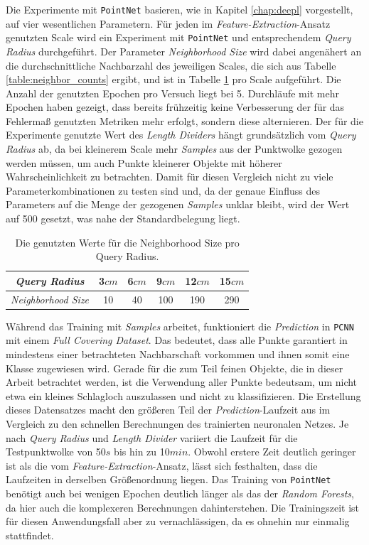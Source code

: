 Die Experimente mit \texttt{PointNet} basieren, wie in Kapitel \ref{chap:deepl} vorgestellt, auf vier wesentlichen Parametern. Für jeden im \textit{Feature-Extraction}-Ansatz genutzten Scale wird ein Experiment mit \texttt{PointNet} und entsprechendem \textit{Query Radius} durchgeführt. Der Parameter \textit{Neighborhood Size} wird dabei angenähert an die durchschnittliche Nachbarzahl des jeweiligen Scales, die sich aus Tabelle \ref{table:neighbor_counts} ergibt, und ist in Tabelle \ref{table:pointnet_params} pro Scale aufgeführt. Die Anzahl der genutzten Epochen pro Versuch liegt bei 5. Durchläufe mit mehr Epochen haben gezeigt, dass bereits frühzeitig keine Verbesserung der für das Fehlermaß genutzten Metriken mehr erfolgt, sondern diese alternieren. Der für die Experimente genutzte Wert des \textit{Length Dividers} hängt grundsätzlich vom \textit{Query Radius} ab, da bei kleinerem Scale mehr \textit{Samples} aus der Punktwolke gezogen werden müssen, um auch Punkte kleinerer Objekte mit höherer Wahrscheinlichkeit zu betrachten. Damit für diesen Vergleich nicht zu viele Parameterkombinationen zu testen sind und, da der genaue Einfluss des Parameters auf die Menge der gezogenen \textit{Samples} unklar bleibt, wird der Wert auf 500 gesetzt, was nahe der Standardbelegung liegt. 

\begin{table}
\centering
\begin{tabular}{c|c|c|c|c|c}
\textit{Query Radius} & 3$cm$ & 6$cm$ & 9$cm$ & 12$cm$ & 15$cm$ \\
\hline
\textit{Neighborhood Size} & 10 & 40 & 100 & 190 & 290 \\
\end{tabular}
\caption{Die genutzten Werte für die Neighborhood Size pro Query Radius.}
\label{table:pointnet_params}
\end{table}

Während das Training mit \textit{Samples} arbeitet, funktioniert die \textit{Prediction} in \texttt{PCNN} mit einem \textit{Full Covering Dataset}. Das bedeutet, dass alle Punkte garantiert in mindestens einer betrachteten Nachbarschaft vorkommen und ihnen somit eine Klasse zugewiesen wird. Gerade für die zum Teil feinen Objekte, die in dieser Arbeit betrachtet werden, ist die Verwendung aller Punkte bedeutsam, um nicht etwa ein kleines Schlagloch auszulassen und nicht zu klassifizieren. Die Erstellung dieses Datensatzes macht den größeren Teil der \textit{Prediction}-Laufzeit aus im Vergleich zu den schnellen Berechnungen des trainierten neuronalen Netzes. Je nach \textit{Query Radius} und \textit{Length Divider} variiert die Laufzeit für die Testpunktwolke von 50$s$ bis hin zu 10$min$. Obwohl erstere Zeit deutlich geringer ist als die vom \textit{Feature-Extraction}-Ansatz, lässt sich festhalten, dass die Laufzeiten in derselben Größenordnung liegen. Das Training von \texttt{PointNet} benötigt auch bei wenigen Epochen deutlich länger als das der \textit{Random Forests}, da hier auch die komplexeren Berechnungen dahinterstehen. Die Trainingszeit ist für diesen Anwendungsfall aber zu vernachlässigen, da es ohnehin nur einmalig stattfindet. \\

